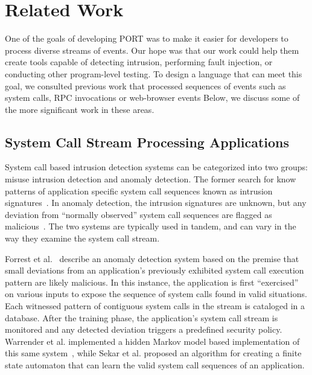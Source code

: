 \section{Related Work}
\label{SEC:related-work}

One of the goals of developing PORT
was to make it easier for developers
to process diverse streams of events.
Our hope was that our work could help them
create tools capable of detecting intrusion,
performing fault injection,
or conducting other program-level testing.
To design a language that can meet this goal,
we consulted
previous work
that processed sequences of events such as
 system calls, RPC invocations or
web-browser events
Below, we discuss some of the more significant work in these areas.


\subsection{System Call Stream Processing Applications}

System call based intrusion detection systems
can be categorized into two groups: misuse
intrusion detection and anomaly detection.
The former search for know patterns of application specific
system call
sequences known as intrusion signatures~\cite{GARCIATEODORO200918}.
In anomaly
detection, the intrusion signatures are unknown,
but any deviation
from ``normally observed'' system call sequences are flagged as
malicious~\cite{DBLP:conf/sp/ForrestHSL96}.
The two systems are typically used in tandem, and
can vary in the way they examine the system call stream.

Forrest et al.~\cite{DBLP:conf/sp/ForrestHSL96} describe
an anomaly detection system based on the premise that small deviations from
an application's previously exhibited system call execution pattern are likely
malicious.
In this instance, the application
is first
``exercised'' on various inputs to expose the
sequence of system calls found in valid situations.
Each witnessed pattern of contiguous system calls in the stream
is cataloged in a database.
After the
training phase, the application's system call stream
is monitored and any detected
deviation triggers a
predefined security policy.
Warrender et al. implemented a hidden Markov model
based implementation of this same system~\cite{DBLP:conf/sp/WarrenderFP99},
while
Sekar et al.\cite{DBLP:conf/sp/SekarBDB01} proposed
an algorithm
for creating a finite state automaton that can learn the valid system
call sequences of an application.

